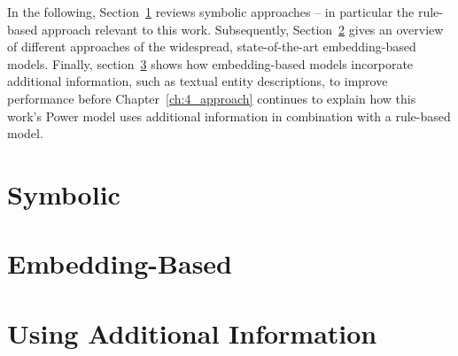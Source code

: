 In the following, Section~\ref{sec:3_related_work/1_symbolic} reviews symbolic approaches -- in particular the rule-based approach relevant to this work. Subsequently, Section~\ref{sec:3_related_work/2_embedding_based} gives an overview of different approaches of the widespread, state-of-the-art embedding-based models. Finally, section~\ref{sec:3_related_work/3_additional_information} shows how embedding-based models incorporate additional information, such as textual entity descriptions, to improve performance before Chapter~\ref{ch:4_approach} continues to explain how this work's Power model uses additional information in combination with a rule-based model.


\section{Symbolic}
\label{sec:3_related_work/1_symbolic}



\section{Embedding-Based}
\label{sec:3_related_work/2_embedding_based}



\section{Using Additional Information}
\label{sec:3_related_work/3_additional_information}

